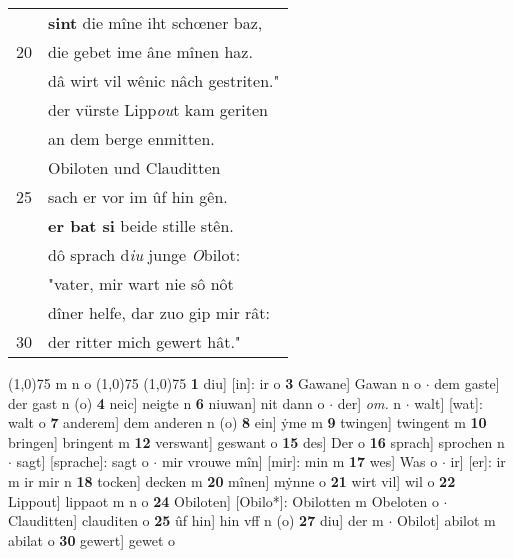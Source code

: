 \documentclass[8pt,a4paper,notitlepage]{article}
\begin{document}
\begin{table}[ht]
\begin{minipage}[t]{0.5\linewidth}
\begin{tabular}{rl}
 & \textbf{sint} die mîne iht schœner baz,\\ 
20 & die gebet ime âne mînen haz.\\ 
 & dâ wirt vil wênic nâch gestriten."\\ 
 & der vürste Lipp\textit{ou}t kam geriten\\ 
 & an dem berge enmitten.\\ 
 & Obiloten und Clauditten\\ 
25 & sach er vor im ûf hin gên.\\ 
 & \textbf{er bat si} beide stille stên.\\ 
 & dô sprach d\textit{iu} junge \textit{O}bilot:\\ 
 & "vater, mir wart nie sô nôt\\ 
 & dîner helfe, dar zuo gip mir rât:\\ 
30 & der ritter mich gewert hât."\\ 
\end{tabular}
\scriptsize
\line(1,0){75} \newline
m n o \newline
\line(1,0){75} \newline
\newline
\line(1,0){75} \newline
\textbf{1} diu] [in]: ir o \textbf{3} Gawane] Gawan n o  $\cdot$ dem gaste] der gast n (o) \textbf{4} neic] neigte n \textbf{6} niuwan] nit dann o  $\cdot$ der] \textit{om.} n  $\cdot$ walt] [wat]: walt o \textbf{7} anderem] dem anderen n (o) \textbf{8} ein] ẏme m \textbf{9} twingen] twingent m \textbf{10} bringen] bringent m \textbf{12} verswant] geswant o \textbf{15} des] Der o \textbf{16} sprach] sprochen n  $\cdot$ sagt] [sprache]: sagt o  $\cdot$ mir vrouwe mîn] [mir]: min m \textbf{17} wes] Was o  $\cdot$ ir] [er]: ir m ir mir n \textbf{18} tocken] decken m \textbf{20} mînen] mẏnne o \textbf{21} wirt vil] wil o \textbf{22} Lippout] lippaot m n o \textbf{24} Obiloten] [Obilo*]: Obilotten m Obeloten o  $\cdot$ Clauditten] clauditen o \textbf{25} ûf hin] hin vff n (o) \textbf{27} diu] der m  $\cdot$ Obilot] abilot m abilat o \textbf{30} gewert] gewet o \newline
\end{minipage}
\end{table}
\newpage
\end{document}
